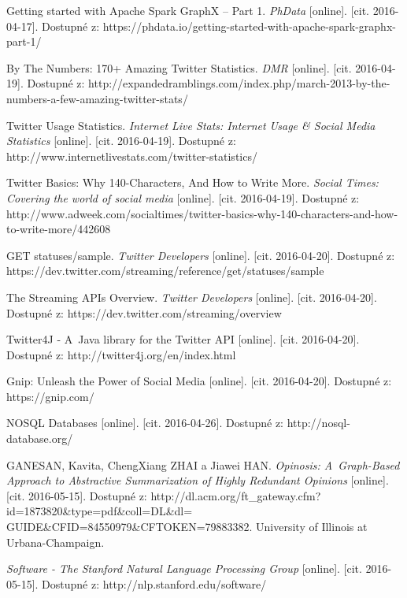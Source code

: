 \documentclass[thesis=B,czech]{FITthesis}[2012/06/26]
\begin{document}
\begin{thebibliography}{1}
Getting started with Apache Spark GraphX – Part 1. \textit{PhData} [online]. [cit. 2016-04-17]. Dostupné z: https://phdata.io/getting-started-with-apache-spark-graphx-part-1/

By The Numbers: 170+ Amazing Twitter Statistics. \textit{DMR} [online]. [cit. 2016-04-19]. Dostupné z: http://expandedramblings.com/index.php/march-2013-by-the-numbers-a-few-amazing-twitter-stats/

Twitter Usage Statistics. \textit{Internet Live Stats: Internet Usage \& Social Media Statistics} [online]. [cit. 2016-04-19]. Dostupné z: http://www.internetlivestats.com/twitter-statistics/

Twitter Basics: Why 140-Characters, And How to Write More. \textit{Social Times: Covering the world of social media} [online]. [cit. 2016-04-19]. Dostupné z: http://www.adweek.com/socialtimes/twitter-basics-why-140-characters-and-how-to-write-more/442608

GET statuses/sample. \textit{Twitter Developers} [online]. [cit. 2016-04-20]. Dostupné z: https://dev.twitter.com/streaming/reference/get/statuses/sample

The Streaming APIs Overview. \textit{Twitter Developers} [online]. [cit. 2016-04-20]. Dostupné z: https://dev.twitter.com/streaming/overview

Twitter4J - A~Java library for the Twitter API [online]. [cit. 2016-04-20]. Dostupné z: http://twitter4j.org/en/index.html

Gnip: Unleash the Power of Social Media [online]. [cit. 2016-04-20]. Dostupné z: https://gnip.com/

NOSQL Databases [online]. [cit. 2016-04-26]. Dostupné z: http://nosql-database.org/

GANESAN, Kavita, ChengXiang ZHAI a Jiawei HAN. \textit{Opinosis: A~Graph-Based Approach to Abstractive Summarization of Highly Redundant Opinions} [online]. [cit. 2016-05-15]. Dostupné z: http://dl.acm.org/ft\_gateway.cfm?id=1873820\&type=pdf\&coll=DL\&dl=\\GUIDE\&CFID=84550979\&CFTOKEN=79883382. University of Illinois at Urbana-Champaign.

\textit{Software - The Stanford Natural Language Processing Group} [online]. [cit. 2016-05-15]. Dostupné z: http://nlp.stanford.edu/software/


\end{thebibliography}
\end{document}
